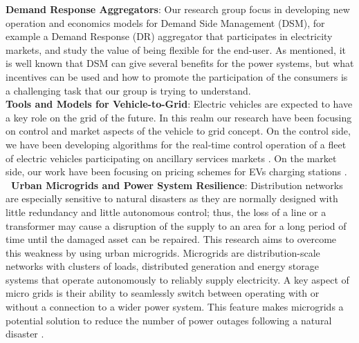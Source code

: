 {\bf Demand Response Aggregators}:  Our research group focus in developing new operation and economics models for Demand Side Management (DSM), for example a Demand Response (DR) aggregator that participates in electricity markets, and study the value of being flexible for the end-user. As mentioned, it is well known that DSM can give several benefits for the power systems, but what incentives can be used and how to promote the participation of the consumers is a challenging task that our group is trying to understand.\\

{\bf Tools and Models for Vehicle-to-Grid}: Electric vehicles are expected to have a key role on the grid of the future. In this realm our research have been focusing on control and market aspects of the vehicle to grid concept. On the control side, we have been developing algorithms for the real-time control operation of a fleet of electric vehicles participating on ancillary services markets \cite{juul15}. On the market side, our work have been focusing on pricing schemes for EVs charging stations \cite{liu15}. \\

{\bf Urban Microgrids and Power System Resilience}: Distribution networks are especially sensitive to natural disasters as they are normally designed with little redundancy and little autonomous control; thus, the loss of a line or a transformer may cause a disruption of the supply to an area for a long period of time until the damaged asset can be repaired. This research aims to overcome this weakness by using urban microgrids. Microgrids are distribution-scale networks with clusters of loads, distributed generation and energy storage systems that operate autonomously to reliably supply electricity. A key aspect of micro grids is their ability to seamlessly switch between operating with or without a connection to a wider power system. This feature makes microgrids a potential solution to reduce the number of power outages following a natural disaster \cite{oli14,oli15,oli15b}.\\

